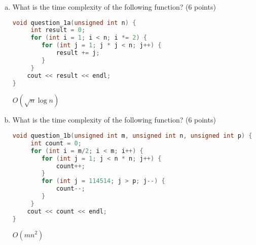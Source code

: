 \documentclass[11pt]{exam}
\begin{document}
\begin{enumerate}[(a)] \label{prb:tiger_code}

\item What is the time complexity of the following function? (6 points)
\begin{lstlisting}[language=c++]
void question_1a(unsigned int n) {
	 int result = 0;
	 for (int i = 1; i < n; i *= 2) {
	 	for (int j = 1; j * j < n; j++) {
	 		result += j;
	 	}
	 }
	cout << result << endl;
}
\end{lstlisting}

\begin{solution}
    $O\left(\sqrt{n} \log n\right)$
\end{solution}

\item What is the time complexity of the following function? (6 points)
\begin{lstlisting}[language=c++]
void question_1b(unsigned int m, unsigned int n, unsigned int p) {
	 int count = 0;
	 for (int i = m/2; i < m; i++) {
	 	for (int j = 1; j < n * n; j++) {
	 		count++;
	 	}
		for (int j = 114514; j > p; j--) {
			count--;
		}	 
	 }
	cout << count << endl;
}
\end{lstlisting}

\begin{solution}
    $O\left(m n^2\right)$
\end{solution}


\end{enumerate}
\end{document}
